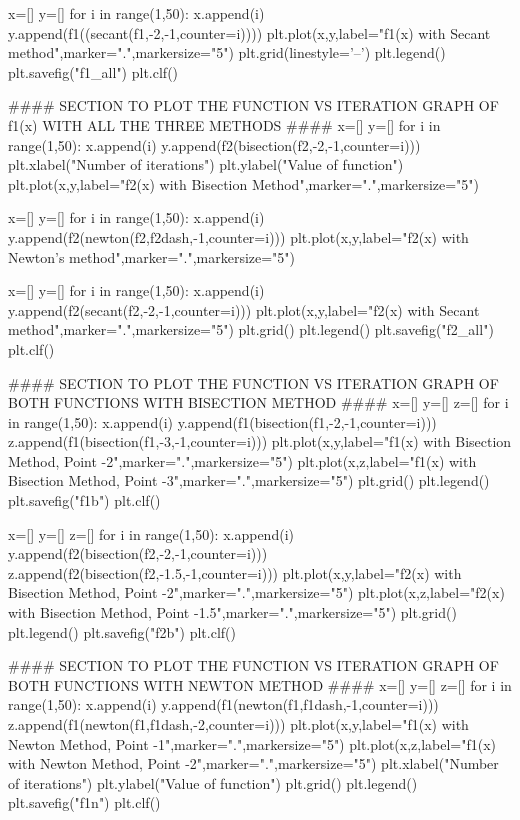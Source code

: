 \documentclass[12pt]{article}
\begin{document}
\begin{python}
x=[]
y=[]
for i in range(1,50):
    x.append(i)
    y.append(f1((secant(f1,-2,-1,counter=i))))
plt.plot(x,y,label="f1(x) with Secant method",marker=".",markersize="5")
plt.grid(linestyle='--')
plt.legend()
plt.savefig("f1_all")
plt.clf()


#### SECTION TO PLOT THE FUNCTION VS ITERATION GRAPH OF f1(x) WITH ALL THE THREE METHODS ####
x=[]
y=[]
for i in range(1,50):
    x.append(i)
    y.append(f2(bisection(f2,-2,-1,counter=i)))
plt.xlabel("Number of iterations")
plt.ylabel("Value of function")
plt.plot(x,y,label="f2(x) with Bisection Method",marker=".",markersize="5")

x=[]
y=[]
for i in range(1,50):
    x.append(i)
    y.append(f2(newton(f2,f2dash,-1,counter=i)))
plt.plot(x,y,label="f2(x) with Newton's method",marker=".",markersize="5")

x=[]
y=[]
for i in range(1,50):
    x.append(i)
    y.append(f2(secant(f2,-2,-1,counter=i)))
plt.plot(x,y,label="f2(x) with Secant method",marker=".",markersize="5")
plt.grid()
plt.legend()
plt.savefig("f2_all")
plt.clf()

#### SECTION TO PLOT THE FUNCTION VS ITERATION GRAPH OF BOTH FUNCTIONS WITH BISECTION METHOD ####
x=[]
y=[]
z=[]
for i in range(1,50):
    x.append(i)
    y.append(f1(bisection(f1,-2,-1,counter=i)))
    z.append(f1(bisection(f1,-3,-1,counter=i)))
plt.plot(x,y,label="f1(x) with Bisection Method, Point -2",marker=".",markersize="5")
plt.plot(x,z,label="f1(x) with Bisection Method, Point -3",marker=".",markersize="5")
plt.grid()
plt.legend()
plt.savefig("f1b")
plt.clf()

x=[]
y=[]
z=[]
for i in range(1,50):
    x.append(i)
    y.append(f2(bisection(f2,-2,-1,counter=i)))
    z.append(f2(bisection(f2,-1.5,-1,counter=i)))
plt.plot(x,y,label="f2(x) with Bisection Method, Point -2",marker=".",markersize="5")
plt.plot(x,z,label="f2(x) with Bisection Method, Point -1.5",marker=".",markersize="5")
plt.grid()
plt.legend()
plt.savefig("f2b")
plt.clf()

#### SECTION TO PLOT THE FUNCTION VS ITERATION GRAPH OF BOTH FUNCTIONS WITH NEWTON METHOD ####
x=[]
y=[]
z=[]
for i in range(1,50):
    x.append(i)
    y.append(f1(newton(f1,f1dash,-1,counter=i)))
    z.append(f1(newton(f1,f1dash,-2,counter=i)))
plt.plot(x,y,label="f1(x) with Newton Method, Point -1",marker=".",markersize="5")
plt.plot(x,z,label="f1(x) with Newton Method, Point -2",marker=".",markersize="5")
plt.xlabel("Number of iterations")
plt.ylabel("Value of function")
plt.grid()
plt.legend()
plt.savefig("f1n")
plt.clf()


\end{python}
\end{document}
